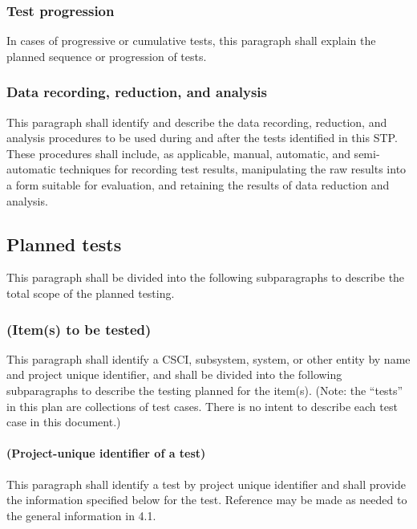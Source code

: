 \documentclass{fidata-report-template}
\begin{document}
\subsubsection{Test progression}

In cases of progressive or cumulative tests, this paragraph shall
explain the planned sequence or progression of tests.

\subsubsection{Data recording, reduction, and analysis}

This paragraph shall identify and describe the data recording,
reduction, and analysis procedures to be used during and after the tests
identified in this STP. These procedures shall include, as applicable,
manual, automatic, and semi-automatic techniques for recording test
results, manipulating the raw results into a form suitable for
evaluation, and retaining the results of data reduction and analysis.

\subsection{Planned tests}

This paragraph shall be divided into the following subparagraphs to
describe the total scope of the planned testing.

\subsubsection{(Item(s) to be tested)}

This paragraph shall identify a CSCI, subsystem, system, or other entity
by name and project unique identifier, and shall be divided into the
following subparagraphs to describe the testing planned for the item(s).
(Note: the ``tests'' in this plan are collections of test cases. There
is no intent to describe each test case in this document.)

\paragraph{(Project-unique identifier of a test)}

This paragraph shall identify a test by project unique identifier and
shall provide the information specified below for the test. Reference
may be made as needed to the general information in 4.1.
\end{document}
